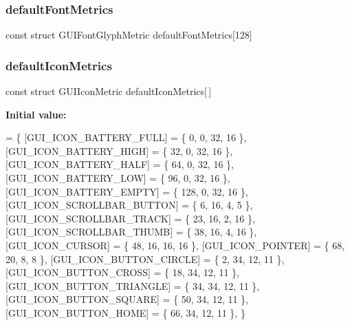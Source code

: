 \subsubsection{\texorpdfstring{default\+Font\+Metrics}{defaultFontMetrics}}
{\footnotesize\ttfamily const struct G\+U\+I\+Font\+Glyph\+Metric default\+Font\+Metrics\mbox{[}128\mbox{]}}

\mbox{\label{font-metrics_8c_a4ca05ea0ad010effc5a4b5a6c5c20232}} 
\subsubsection{\texorpdfstring{default\+Icon\+Metrics}{defaultIconMetrics}}
{\footnotesize\ttfamily const struct G\+U\+I\+Icon\+Metric default\+Icon\+Metrics\mbox{[}$\,$\mbox{]}}

{\bfseries Initial value\+:}
\begin{DoxyCode}
= \{
    [GUI\_ICON\_BATTERY\_FULL] = \{ 0, 0, 32, 16 \},
    [GUI\_ICON\_BATTERY\_HIGH] = \{ 32, 0, 32, 16 \},
    [GUI\_ICON\_BATTERY\_HALF] = \{ 64, 0, 32, 16 \},
    [GUI\_ICON\_BATTERY\_LOW] = \{ 96, 0, 32, 16 \},
    [GUI\_ICON\_BATTERY\_EMPTY] = \{ 128, 0, 32, 16 \},
    [GUI\_ICON\_SCROLLBAR\_BUTTON] = \{ 6, 16, 4, 5 \},
    [GUI\_ICON\_SCROLLBAR\_TRACK] = \{ 23, 16, 2, 16 \},
    [GUI\_ICON\_SCROLLBAR\_THUMB] = \{ 38, 16, 4, 16 \},
    [GUI\_ICON\_CURSOR] = \{ 48, 16, 16, 16 \},
    [GUI\_ICON\_POINTER] = \{ 68, 20, 8, 8 \},
    [GUI\_ICON\_BUTTON\_CIRCLE] = \{ 2, 34, 12, 11 \},
    [GUI\_ICON\_BUTTON\_CROSS] = \{ 18, 34, 12, 11 \},
    [GUI\_ICON\_BUTTON\_TRIANGLE] = \{ 34, 34, 12, 11 \},
    [GUI\_ICON\_BUTTON\_SQUARE] = \{ 50, 34, 12, 11 \},
    [GUI\_ICON\_BUTTON\_HOME] = \{ 66, 34, 12, 11 \},
\}
\end{DoxyCode}
